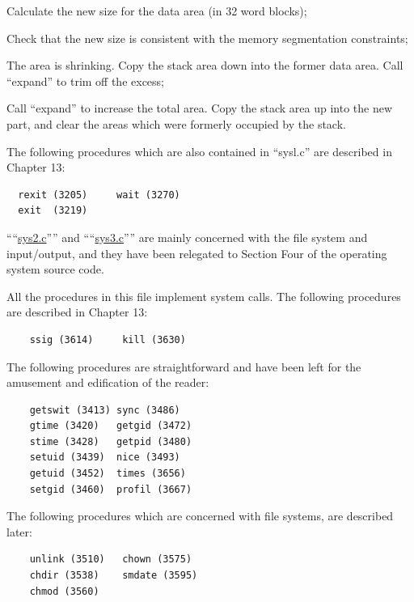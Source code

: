 \bd
\item[3364:] Calculate the new size for the
 data area (in 32 word blocks);

\item[3371:] Check that the new size is consistent with the memory
segmentation constraints;

\item[3376:] The area is shrinking. Copy the
 stack area down into the former
 data area. Call ``expand'' to trim
 off the excess;

\item[3386:] Call ``expand'' to increase the
 total area. Copy the stack area
 up into the new part, and clear
the areas which were formerly
occupied by the stack.
\ed

The following procedures which are also
contained in ``sysl.c'' are described in
Chapter 13:

\begin{verbatim}
  rexit (3205)     wait (3270)
  exit  (3219)
\end{verbatim}


````\href{./v6/ken/sys2.c}{sys2.c}'''' and ````\href{./v6/ken/sys3.c}{sys3.c}'''' are mainly concerned with the file system and
input/output, and they have been
relegated to Section Four of the
operating system source code.



All the procedures in this file implement system calls.
The following procedures are described in Chapter 13:

\begin{verbatim}
    ssig (3614)     kill (3630)
\end{verbatim}

The following procedures are straightforward and have been left for the
amusement and edification of the reader:

\begin{verbatim}
    getswit (3413) sync (3486)
    gtime (3420)   getgid (3472)
    stime (3428)   getpid (3480)
    setuid (3439)  nice (3493)
    getuid (3452)  times (3656)
    setgid (3460)  profil (3667)
\end{verbatim}

The following procedures which are concerned with file systems, are described
later:

\begin{verbatim}
    unlink (3510)   chown (3575)
    chdir (3538)    smdate (3595)
    chmod (3560)
\end{verbatim}
